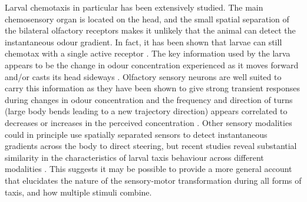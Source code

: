 \documentclass[11pt,a4paper]{article}
\begin{document}
Larval chemotaxis in particular has been extensively studied. The main chemosensory organ is located on the head, and the small spatial separation of the bilateral olfactory receptors makes it unlikely that the animal can detect the instantaneous odour gradient. In fact, it has been shown that larvae can still chemotax with a single active receptor  \citep{fishilevich2005chemotaxis,gomez2010mechanisms,louis2008bilateral}. The key information used by the larva  appears to be the change in odour concentration experienced as it moves forward and/or casts its head sideways \citep{gomez2010mechanisms}. 
Olfactory sensory neurons are well suited to carry this information as they have been shown to give strong transient responses during changes in odour concentration \citep{de2013common,nagel2011biophysical,kim2011system,schulze2015dynamical} and the frequency and direction of turns (large body bends leading to a new trajectory direction) appears correlated to  decreases or increases in the perceived concentration \citep{hernandez2015reverse,schulze2015dynamical}. 
  Other sensory modalities could in principle use spatially separated sensors to detect instantaneous gradients across the body to direct steering, but recent studies reveal substantial similarity in the characteristics of larval taxis behaviour across different modalities \citep{gepner2015computations, bellmann2010optogenetically, lahiri2011two}. This suggests it may be possible to provide a more general account that elucidates the nature of the sensory-motor transformation during all forms of taxis, and how multiple stimuli combine. 
\end{document}
